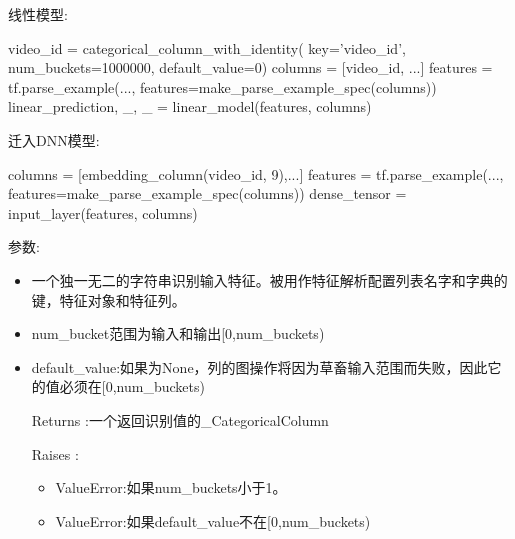 线性模型:
\begin{python}
video_id = categorical_column_with_identity(
    key='video_id', num_buckets=1000000, default_value=0)
columns = [video_id, ...]
features = tf.parse_example(..., features=make_parse_example_spec(columns))
linear_prediction, _, _ = linear_model(features, columns)
\end{python}
迁入DNN模型:
\begin{python}
columns = [embedding_column(video_id, 9),...]
features = tf.parse_example(..., features=make_parse_example_spec(columns))
dense_tensor = input_layer(features, columns)
\end{python}
参数:
\begin{itemize}
	\item 一个独一无二的字符串识别输入特征。被用作特征解析配置列表名字和字典的键，特征对象和特征列。
	\item num\_bucket范围为输入和输出[0,num\_buckets)
	\item default\_value:如果为None，列的图操作将因为草畜输入范围而失败，因此它的值必须在[0,num\_buckets)
	\item[Returns]:一个返回识别值的\_CategoricalColumn
	\item[Raises]:
	\begin{itemize}
		\item ValueError:如果num\_buckets小于1。
		\item ValueError:如果default\_value不在[0,num\_buckets)
	\end{itemize}
\end{itemize}
